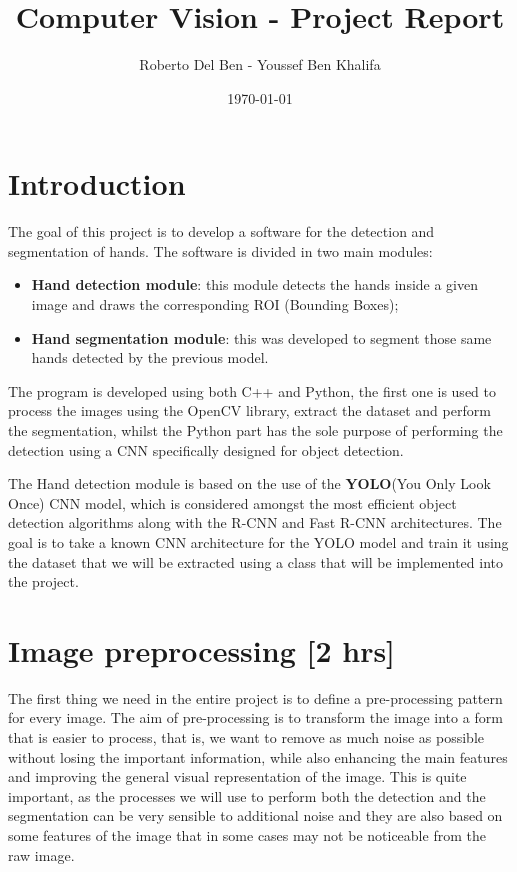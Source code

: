 
\title{Computer Vision - Project Report}
\author{Roberto Del Ben - Youssef Ben Khalifa}
\date{\today}

\maketitle \tableofcontents
\newpage

\section{Introduction}
The goal of this project is to develop a software for the detection and segmentation  of hands. The software is divided in two main modules:
\begin{itemize}
    \item \textbf{Hand detection module}: this module detects the hands inside a given image and draws the corresponding ROI (Bounding Boxes);
    \item \textbf{Hand segmentation module}: this was developed to segment those same hands detected by the previous model.
\end{itemize}

The program is developed using both C++ and Python, the first one is used to process the images using the OpenCV library, extract the dataset and perform
the segmentation, whilst the Python part has the sole purpose of performing the detection using a CNN specifically designed for object detection.

The Hand detection module is based on the use of the \textbf{YOLO}(You Only Look Once) CNN model, which is considered amongst the most efficient object detection algorithms
along with the R-CNN and Fast R-CNN architectures. The goal is to take a known CNN architecture for the YOLO model and train it using the dataset that we will be extracted using
a class that will be implemented into the project.

\section{Image preprocessing [2 hrs]}

The first thing we need in the entire project is to define a pre-processing pattern for every image. The aim of pre-processing is to transform the image into a form 
that is easier to process, that is, we want to remove as much noise as possible without losing the important information, while also enhancing the main features and 
improving the general visual representation of the image. This is quite important, as the processes we will use to perform both the detection and the segmentation 
can be very sensible to additional noise and they are also based on some features of the image that in some cases may not be noticeable from the raw image.

